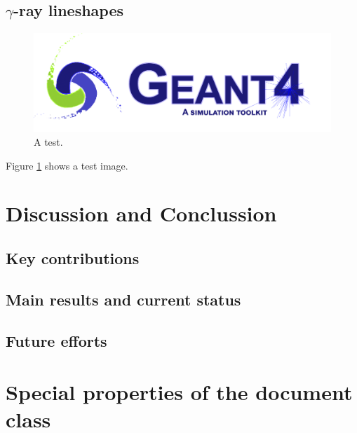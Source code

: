 \documentclass[utf8,bachelor,english,draft]{gradu3}
\begin{document}
    \section{$\gamma$-ray lineshapes}
        \begin{figure}[h!]
            \includegraphics[width=\linewidth]{test.png}
            \caption{A test.}
            \label{fig:test2}
        \end{figure}
        Figure \ref{fig:test2} shows a test image.

\chapter{Discussion and Conclussion}
    \section{Key contributions}
    \section{Main results and current status}
    \section{Future efforts}

\chapter{Special properties of the document class}
\end{document}
